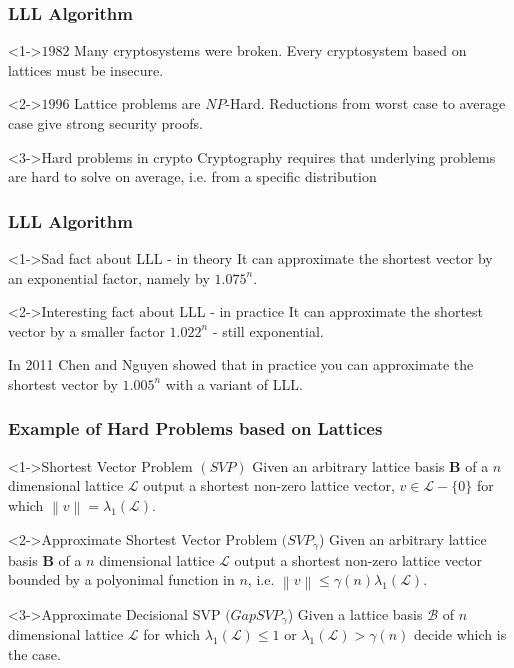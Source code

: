 \documentclass{beamer}
\newcommand{\norm}[1]{\left\lVert#1\right\rVert}
\begin{document}
\begin{frame}
    \frametitle{LLL Algorithm}
    \begin{block}<1->{$1982$}
        Many cryptosystems were broken. Every cryptosystem based on lattices must be insecure.
    \end{block}
    \begin{block}<2->{$1996$}
    Lattice problems are $NP$-Hard. Reductions from worst case to average case give strong security proofs.

    \end{block}
    \begin{block}<3->{Hard problems in crypto}
        Cryptography requires that underlying problems are hard to solve on average, i.e. from a specific distribution
    \end{block}
\end{frame}

\begin{frame}
    \frametitle{LLL Algorithm}
    \begin{block}<1->{Sad fact about LLL - in theory}
        It can approximate the shortest vector by an exponential factor, namely by $1.075^n$.
    \end{block}
    \begin{block}<2->{Interesting fact about LLL - in practice}
        It can approximate the shortest vector by a smaller factor $1.022^n$ - still exponential.

        \pause \pause In 2011 Chen and Nguyen showed that in practice you can approximate the shortest vector by $1.005^n$ with a variant of LLL.
    \end{block}
\end{frame}

\begin{frame}
    \frametitle{Example of Hard Problems based on Lattices}
    \begin{block}<1->{Shortest Vector Problem $(SVP)$}
        Given an arbitrary lattice basis $\mathbf{B}$ of a $n$ dimensional lattice $\mathcal{L}$ output a shortest non-zero lattice vector, $v \in \mathcal{L} - \{0 \}$ for which $\norm{v} = \lambda_1(\mathcal{L})$.
    \end{block}

    \begin{block}<2->{Approximate Shortest Vector Problem $(SVP_{\gamma}$)}
        Given an arbitrary lattice basis $\mathbf{B}$ of a $n$ dimensional lattice $\mathcal{L}$ output a shortest non-zero lattice vector bounded by a polyonimal function in $n$, i.e. $\norm{v} \leq \gamma(n) \lambda_1(\mathcal{L})$.
    \end{block}

    \begin{block}<3->{Approximate Decisional SVP $(GapSVP_{\gamma}$)}
        Given a lattice basis $\mathcal{B}$ of $n$ dimensional lattice $\mathcal{L}$ for which $\lambda_1(\mathcal{L}) \leq 1$ or $\lambda_1(\mathcal{L}) > \gamma(n)$ decide which is the case.
    \end{block}
\end{frame}
\end{document}
